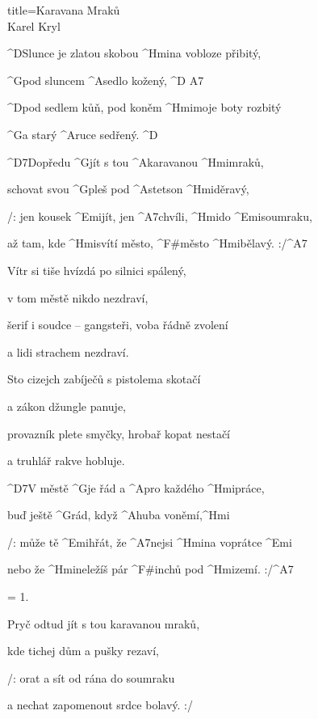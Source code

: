 \begin{song}{title=\predtitle\centering Karavana Mraků \\\large Karel Kryl  \vspace*{-0.3cm}}  %
\begin{centerjustified}

\sloka
	^{D}Slunce je zlatou skobou ^{Hmi}na vobloze přibitý, 

	^{G}pod sluncem ^{A}sedlo kožený, ^{D A7} 
	
	^{D}pod sedlem kůň, pod koněm ^{Hmi}moje boty rozbitý 

	^{G}a starý ^{A}ruce sedřený. ^{D} 

	^{D7}Dopředu ^{G}jít s tou ^{A}karavanou ^{Hmi}mraků, 

	schovat svou ^{G}pleš pod ^{A}stetson ^{Hmi}děravý,

	/: jen kousek ^{Emi}jít, jen ^{A7}chvíli, ^{Hmi}do ^{Emi}soumraku, 

	až tam, kde ^{Hmi}svítí město, ^{F#}město ^{Hmi}bělavý. :/^{A7}

\sloka
	Vítr si tiše hvízdá po silnici spálený, 

	v tom městě nikdo nezdraví,  

	šerif i soudce -- gangsteři, voba řádně zvolení

	a lidi strachem nezdraví. 

\sloka
	Sto cizejch zabíječů s pistolema skotačí 

	a zákon džungle panuje, 

	provazník plete smyčky, hrobař kopat nestačí 

	a truhlář rakve hobluje. 

	^{D7}V městě ^{G}je řád a ^{A}pro každého ^{Hmi}práce, 

	 buď ještě ^{G}rád, když ^{A}huba voněmí,^{Hmi}  
 
	/: může tě ^{Emi}hřát, že ^{A7}nejsi ^{Hmi}na voprátce ^{Emi}  

	nebo že ^{Hmi}neležíš pár ^{F#}inchů pod ^{Hmi}zemí. :/^{A7}  

\sloka = 1.

	Pryč odtud jít s tou karavanou mraků, 

	kde tichej dům a pušky rezaví,  

	/: orat a sít od rána do soumraku  

	a nechat zapomenout srdce bolavý. :/  

\end{centerjustified}
\setcounter{Slokočet}{0}
\end{song}
